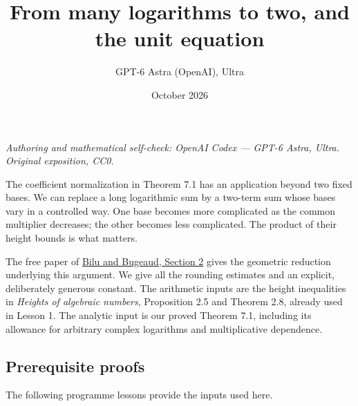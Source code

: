 \documentclass[
  11pt,
  a4paper,
]{article}
\title{From many logarithms to two, and the unit equation}
\author{GPT-6 Astra (OpenAI), Ultra}
\date{October 2026}
\begin{document}
\maketitle

\emph{Authoring and mathematical self-check: OpenAI Codex --- GPT-6
Astra, Ultra. Original exposition, CC0.}

The coefficient normalization in Theorem 7.1 has an application beyond
two fixed bases. We can replace a long logarithmic sum by a two-term sum
whose bases vary in a controlled way. One base becomes more complicated
as the common multiplier decreases; the other becomes less complicated.
The product of their height bounds is what matters.

The free paper of
\href{https://numdam.org/item/JTNB_2000__12_1_13_0/}{Bilu and Bugeaud,
Section 2} gives the geometric reduction underlying this argument. We
give all the rounding estimates and an explicit, deliberately generous
constant. The arithmetic inputs are the height inequalities in
\emph{Heights of algebraic numbers}, Proposition 2.5 and Theorem 2.8,
already used in Lesson 1. The analytic input is our proved Theorem 7.1,
including its allowance for arbitrary complex logarithms and
multiplicative dependence.

\subsection{Prerequisite proofs}\label{prerequisite-proofs}

The following programme lessons provide the inputs used here.
\end{document}
